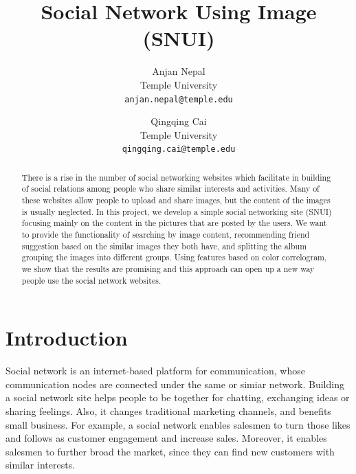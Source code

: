 \documentclass[10pt,twocolumn,letterpaper]{article}
\begin{document}
\title{Social Network Using Image (SNUI)}

\author{
Anjan Nepal\\
Temple University\\
{\tt\small anjan.nepal@temple.edu}
\and
Qingqing Cai\\
Temple University\\
{\tt\small qingqing.cai@temple.edu}
}

\maketitle

\begin{abstract}
There is a rise in the number of social networking websites which facilitate in building of social relations among people who share similar interests and activities. Many of these websites allow people to upload and share images, but the content of the images is usually neglected. In this project, we develop a simple social networking site (SNUI) focusing mainly on the content in the pictures that are posted by the users. We want to provide the functionality of searching by image content, recommending friend suggestion based on the similar images they both have, and splitting the album grouping the images into different groups. Using features based on color correlogram, we show that the results are promising and this approach can open up a new way people use the social network websites.
\end{abstract}

\section{Introduction}
Social network is an internet-based platform for communication, whose communication nodes are connected under the same or simiar network. Building a social network site helps people to be together for chatting, exchanging ideas or sharing feelings. Also, it changes traditional marketing channels, and benefits small business. For example, a social network enables salesmen to turn those likes and follows as customer engagement and increase sales. Moreover, it enables salesmen to further broad the market, since they can find new customers with similar interests.
\end{document}
